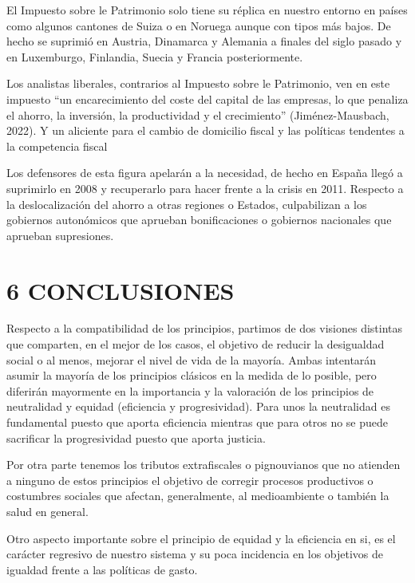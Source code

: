 \documentclass[
]{article}
\begin{document}
El Impuesto sobre le Patrimonio solo tiene su réplica en nuestro entorno
en países como algunos cantones de Suiza o en Noruega aunque con tipos
más bajos. De hecho se suprimió en Austria, Dinamarca y Alemania a
finales del siglo pasado y en Luxemburgo, Finlandia, Suecia y Francia
posteriormente.

Los analistas liberales, contrarios al Impuesto sobre le Patrimonio, ven
en este impuesto ``un encarecimiento del coste del capital de las
empresas, lo que penaliza el ahorro, la inversión, la productividad y el
crecimiento'' (Jiménez-Mausbach, 2022). Y un aliciente para el cambio de
domicilio fiscal y las políticas tendentes a la competencia fiscal

Los defensores de esta figura apelarán a la necesidad, de hecho en
España llegó a suprimirlo en 2008 y recuperarlo para hacer frente a la
crisis en 2011. Respecto a la deslocalización del ahorro a otras
regiones o Estados, culpabilizan a los gobiernos autonómicos que
aprueban bonificaciones o gobiernos nacionales que aprueban supresiones.

\hypertarget{conclusiones}{%
\section*{6 CONCLUSIONES}\label{conclusiones}}

Respecto a la compatibilidad de los principios, partimos de dos visiones
distintas que comparten, en el mejor de los casos, el objetivo de
reducir la desigualdad social o al menos, mejorar el nivel de vida de la
mayoría. Ambas intentarán asumir la mayoría de los principios clásicos
en la medida de lo posible, pero diferirán mayormente en la importancia
y la valoración de los principios de neutralidad y equidad (eficiencia y
progresividad). Para unos la neutralidad es fundamental puesto que
aporta eficiencia mientras que para otros no se puede sacrificar la
progresividad puesto que aporta justicia.

Por otra parte tenemos los tributos extrafiscales o pignouvianos que no
atienden a ninguno de estos principios el objetivo de corregir procesos
productivos o costumbres sociales que afectan, generalmente, al
medioambiente o también la salud en general.

Otro aspecto importante sobre el principio de equidad y la eficiencia en
si, es el carácter regresivo de nuestro sistema y su poca incidencia en
los objetivos de igualdad frente a las políticas de gasto.
\end{document}

